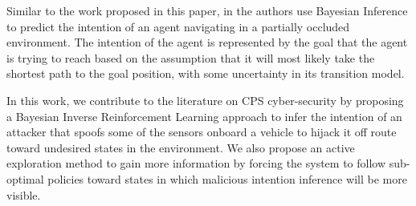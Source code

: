 \documentclass[letterpaper, 10 pt, conference]{ieeeconf}  %
\begin{document}

Similar to the work proposed in this paper, in \cite{best2015bayesian} the authors use Bayesian Inference to predict the intention of an agent navigating in a partially occluded environment. The intention of the agent is represented by the goal that the agent is trying to reach based on the assumption that it will most likely take the shortest path to the goal position, with some uncertainty in its transition model.

In this work, we contribute to the literature on CPS cyber-security by proposing a Bayesian Inverse Reinforcement Learning approach to infer the intention of an attacker that spoofs some of the sensors onboard a vehicle to hijack it off route toward undesired states in the environment. We also propose an active exploration method to gain more information by forcing the system to follow sub-optimal policies toward states in which malicious intention inference will be more visible.
%
\end{document}

